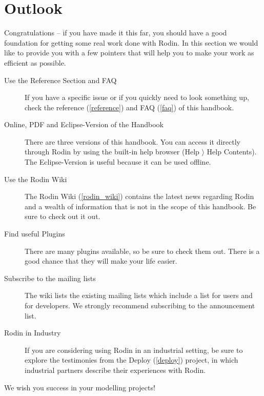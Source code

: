 \section{Outlook}
\label{tut_outlook}

Congratulations -- if you have made it this far, you should have a good foundation for getting some real work done with Rodin.  In this section we would like to provide you with a few pointers that will help you to make your work as efficient as possible.

\begin{description}
	\item[Use the Reference Section and FAQ] If you have a specific issue or if you quickly need to look something up, check the reference (\ref{reference}) and FAQ (\ref{faq}) of this handbook.
	\item[Online, PDF and Eclipse-Version of the Handbook] There are three versions of this handbook.  You can access it directly through Rodin by using the built-in help browser (\textsf{Help $\rangle$ Help Contents}).  The Eclipse-Version is useful because it can be used offline.
	\item[Use the Rodin Wiki] The Rodin Wiki (\ref{rodin_wiki}) contains the latest news regarding Rodin and a wealth of information that is not in the scope of this handbook.  Be sure to check out it out.
	\item[Find useful Plugins] There are many plugins available, so be sure to check them out.  There is a good chance that they will make your life easier.
	\item[Subscribe to the mailing lists] The wiki lists the existing mailing lists which include a list for users and for developers.  We strongly recommend subscribing to the announcement list.
	\item[Rodin in Industry] If you are considering using Rodin in an industrial setting, be sure to explore the testimonies from the Deploy (\ref{deploy}) project, in which industrial partners describe their experiences with Rodin.
\end{description}

We wish you success in your modelling projects!

